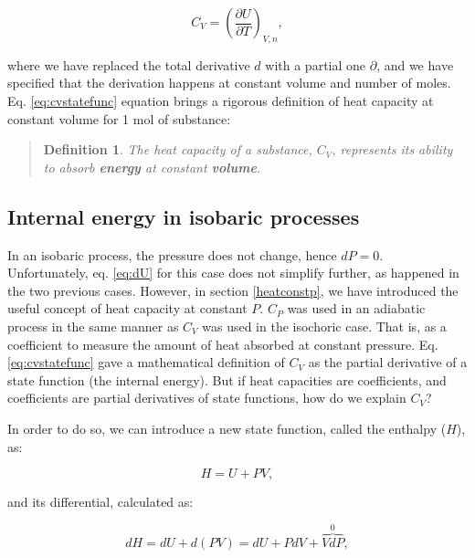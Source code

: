 \documentclass[
  9pt,
]{extbook}
\theoremstyle{definition}
\newtheorem{definition}{Definition}[chapter]
\theoremstyle{definition}
\theoremstyle{definition}
\theoremstyle{remark}
\begin{document}
\begin{equation}
  C_V = \left( \frac{\partial U} {\partial T} \right)_{V,n},
  \label{eq:cvstatefunc}
\end{equation}

where we have replaced the total derivative \(d\) with a partial one \(\partial\), and we have specified that the derivation happens at constant volume and number of moles. Eq. \eqref{eq:cvstatefunc} equation brings a rigorous definition of heat capacity at constant volume for 1 mol of substance:

\begin{quote}
\begin{definition}
\protect\hypertarget{def:newdefcv}{}{\label{def:newdefcv} }\emph{The heat capacity of a substance, \(C_V\), represents its ability to absorb \textbf{energy} at constant \textbf{volume}.}
\end{definition}
\end{quote}

\hypertarget{enthalpy}{%
\subsection{Internal energy in isobaric processes}\label{enthalpy}}

In an isobaric process, the pressure does not change, hence \(dP=0\). Unfortunately, eq. \eqref{eq:dU} for this case does not simplify further, as happened in the two previous cases. However, in section \ref{heatconstp}, we have introduced the useful concept of heat capacity at constant \(P\). \(C_P\) was used in an adiabatic process in the same manner as \(C_V\) was used in the isochoric case. That is, as a coefficient to measure the amount of heat absorbed at constant pressure. Eq. \eqref{eq:cvstatefunc} gave a mathematical definition of \(C_V\) as the partial derivative of a state function (the internal energy). But if heat capacities are coefficients, and coefficients are partial derivatives of state functions, how do we explain \(C_V\)?

In order to do so, we can introduce a new state function, called the enthalpy (\(H\)), as:

\begin{equation}
  H = U + PV,
  \label{eq:enthalpydef}
\end{equation}

and its differential, calculated as:

\begin{equation}
  dH = dU + d(PV) = dU + PdV + \overbrace{VdP}^{0},
  \label{eq:enthalpydefdiff}
\end{equation}
\end{document}
